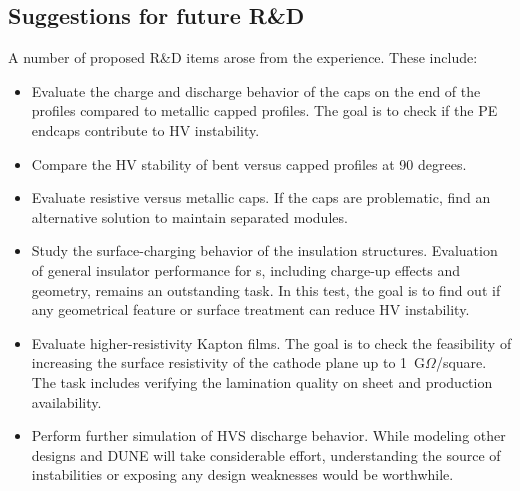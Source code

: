 \subsection{Suggestions for future R\&D}
\label{sec:fdsp-hv-protodune-RD}

A number of proposed R\&D items arose from the  experience.  These include:
\begin{itemize}
\item Evaluate the charge and discharge behavior of the  caps on the end of the profiles compared to metallic capped profiles.  The goal is to check if the PE endcaps contribute to HV instability. 
\item Compare the HV stability of bent versus capped profiles at 90 degrees. %
\item Evaluate resistive versus metallic caps.  If the  caps are %
problematic, find an alternative solution to maintain separated  modules.
\item Study the surface-charging behavior of the  insulation structures.  Evaluation of general insulator performance for \lartpc{}s, including charge-up effects and geometry, remains an outstanding task.  In this test, the goal is to find out if any geometrical feature or surface treatment can reduce HV instability.
\item Evaluate higher-resistivity Kapton films.  The goal is to check the feasibility of increasing the surface resistivity of the cathode plane up to 1~G$\Omega$/square.  The task includes verifying the lamination quality on \frfour sheet and production availability.
\item Perform further simulation of  HVS discharge behavior.   While modeling other  designs and DUNE will take considerable effort, %
understanding the source of instabilities or exposing any design weaknesses would be worthwhile. %
\end{itemize}


